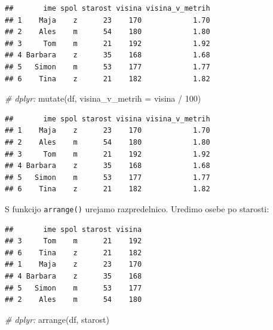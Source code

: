 \documentclass[
]{book}
\newenvironment{Shaded}{\begin{snugshade}}{\end{snugshade}}
\newcommand{\AttributeTok}[1]{\textcolor[rgb]{0.77,0.63,0.00}{#1}}
\newcommand{\CommentTok}[1]{\textcolor[rgb]{0.56,0.35,0.01}{\textit{#1}}}
\newcommand{\DecValTok}[1]{\textcolor[rgb]{0.00,0.00,0.81}{#1}}
\newcommand{\FunctionTok}[1]{\textcolor[rgb]{0.00,0.00,0.00}{#1}}
\newcommand{\NormalTok}[1]{#1}
\newcommand{\SpecialCharTok}[1]{\textcolor[rgb]{0.00,0.00,0.00}{#1}}
\begin{document}
\begin{verbatim}
##       ime spol starost visina visina_v_metrih
## 1    Maja    z      23    170            1.70
## 2    Ales    m      54    180            1.80
## 3     Tom    m      21    192            1.92
## 4 Barbara    z      35    168            1.68
## 5   Simon    m      53    177            1.77
## 6    Tina    z      21    182            1.82
\end{verbatim}

\begin{Shaded}
\begin{Highlighting}[]
\CommentTok{\# dplyr:}
\FunctionTok{mutate}\NormalTok{(df, }\AttributeTok{visina\_v\_metrih =}\NormalTok{ visina }\SpecialCharTok{/} \DecValTok{100}\NormalTok{)}
\end{Highlighting}
\end{Shaded}

\begin{verbatim}
##       ime spol starost visina visina_v_metrih
## 1    Maja    z      23    170            1.70
## 2    Ales    m      54    180            1.80
## 3     Tom    m      21    192            1.92
## 4 Barbara    z      35    168            1.68
## 5   Simon    m      53    177            1.77
## 6    Tina    z      21    182            1.82
\end{verbatim}

S funkcijo \texttt{arrange()} urejamo razpredelnico. Uredimo osebe po starosti:

\begin{Shaded}
\end{Shaded}

\begin{verbatim}
##       ime spol starost visina
## 3     Tom    m      21    192
## 6    Tina    z      21    182
## 1    Maja    z      23    170
## 4 Barbara    z      35    168
## 5   Simon    m      53    177
## 2    Ales    m      54    180
\end{verbatim}

\begin{Shaded}
\begin{Highlighting}[]
\CommentTok{\# dplyr:}
\FunctionTok{arrange}\NormalTok{(df, starost)}
\end{Highlighting}
\end{Shaded}
\end{document}
